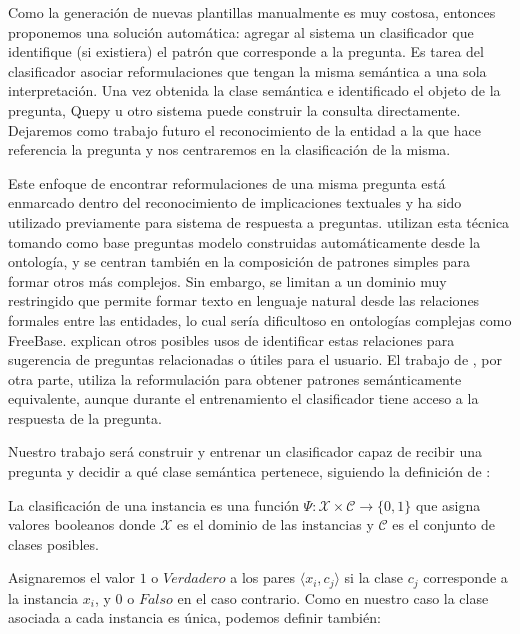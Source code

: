 Como la generación de nuevas plantillas manualmente es muy costosa, entonces proponemos una solución automática: agregar al sistema un clasificador que identifique (si existiera) el patrón que corresponde a la pregunta. Es tarea del clasificador asociar reformulaciones que tengan la misma semántica a una sola interpretación. Una vez obtenida la clase semántica e identificado el objeto de la pregunta, Quepy u otro sistema puede construir la consulta directamente. Dejaremos como trabajo futuro el reconocimiento de la entidad a la que hace referencia la pregunta y nos centraremos en la clasificación de la misma.

Este enfoque de encontrar reformulaciones de una misma pregunta está enmarcado dentro del reconocimiento de implicaciones textuales y ha sido utilizado previamente para sistema de respuesta a preguntas. \citet{ou_entailement} utilizan esta técnica tomando como base preguntas modelo construidas automáticamente desde la ontología, y se centran también en la composición de patrones simples para formar otros más complejos. Sin embargo, se limitan a un dominio muy restringido que permite formar texto en lenguaje natural desde las relaciones formales entre las entidades, lo cual sería dificultoso en ontologías complejas como FreeBase. \citet{rui_relations} explican otros posibles usos de identificar estas relaciones para sugerencia de preguntas relacionadas o útiles para el usuario. El trabajo de \citet{Kosseimmuyparecido}, por otra parte, utiliza la reformulación para obtener patrones semánticamente equivalente, aunque durante el entrenamiento el clasificador tiene acceso a la respuesta de la pregunta.

Nuestro trabajo será construir y entrenar un clasificador capaz de recibir una pregunta y decidir a qué clase semántica pertenece, siguiendo la definición de \citet{Sebastiani-text-categorization}:

\begin{definition}
La clasificación de una instancia es una función $\Psi:\mathcal{X} \times \mathcal{C} \rightarrow \{0, 1\}$ que asigna valores booleanos donde $\mathcal{X}$ es el dominio de las instancias y $\mathcal{C}$ es el conjunto de clases posibles.
\end{definition}

Asignaremos el valor $1$ o $Verdadero$ a los pares $\langle x_i, c_j \rangle$ si la clase $c_j$ corresponde a la instancia $x_i$, y $0$ o $Falso$ en el caso contrario. Como en nuestro caso la clase asociada a cada instancia es única, podemos definir también:

